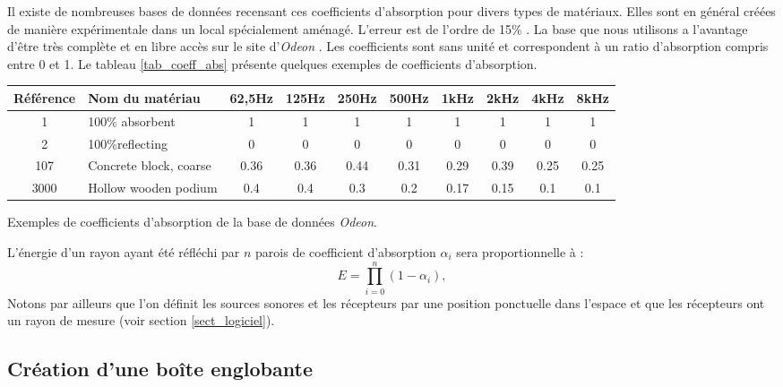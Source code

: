 Il existe de nombreuses bases de données recensant ces coefficients d'absorption pour divers types de matériaux. Elles sont en général créées de manière expérimentale dans un local spécialement aménagé. L'erreur est de l'ordre de 15\% \cite[]{acouphile}. La base que nous utilisons a l'avantage d'être très complète et en libre accès sur le site d'\textit{Odeon} \cite[Materials]{odeon}. Les coefficients sont sans unité et correspondent à un ratio d'absorption compris entre 0 et 1. Le tableau \ref{tab_coeff_abs} présente quelques exemples de coefficients d'absorption. 
%
\begin{tableth}
\footnotesize
	\begin{tabular}{| c | m{2.5cm} | *{8}{c|}}
		\hline
		Référence & Nom du matériau & 62,5Hz & 125Hz & 250Hz & 500Hz & 1kHz & 2kHz & 4kHz & 8kHz \\
		  \hline
		  \hline
		   1 & 100\% absorbent & 1 & 1 & 1 & 1 & 1 & 1 & 1 & 1 \\
		   \hline
		2 & 100\%reflecting & 0 & 0 & 0 & 0 & 0 & 0 & 0 & 0 \\
		   \hline
		107 & Concrete block, coarse\footnotemark & 0.36 & 0.36 & 0.44 & 0.31 & 0.29 & 0.39 & 0.25 & 0.25 \\
		   \hline
		3000 & Hollow wooden podium\footnotemark & 0.4 & 0.4 & 0.3 & 0.2 & 0.17 & 0.15 & 0.1 & 0.1 \\
	     \hline
	 \end{tabular}
	\caption{Exemples de coefficients d'absorption de la base de données \textit{Odeon}.}
	 \label{tab_coeff_abs}
\end{tableth}
\addtocounter{footnote}{-1}
\addtocounter{footnote}{1}
%


L'énergie d'un rayon ayant été réfléchi par $n$ parois de coefficient d'absorption $\alpha_i$ sera proportionnelle à :
\begin{equation} \label{eq_coeff_abs}
E = \prod_{i=0}^n (1-\alpha_i),
\end{equation}
%
Notons par ailleurs que l'on définit les sources sonores et les récepteurs par une position ponctuelle dans l'espace et que les récepteurs ont un rayon de mesure (voir section \ref{sect_logiciel}). %

\subsection{Création d'une boîte englobante} \label{sect_boîteenglobante}

